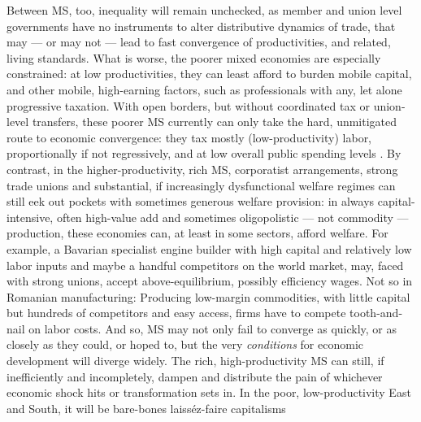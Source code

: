\documentclass[11pt,a4paper,oneside,openright]{article}
\begin{document}
Between \gls{MS}, too, inequality will remain unchecked, as member and union level governments have no instruments to alter distributive dynamics of trade, that may --- or may not --- lead to fast convergence of productivities, and related, living standards. 
What is worse, the poorer mixed economies are especially constrained: 
at low productivities, they can least afford to burden mobile capital, and other mobile, high-earning factors, such as professionals with any, let alone progressive taxation. 
With open borders, but without coordinated tax or union-level transfers, these poorer \gls{MS} currently can only take the hard, unmitigated route to economic convergence: 
they tax mostly (low-productivity) labor, proportionally if not regressively, and at low overall public spending levels \citep[e.g.][267]{DaudUngl2008}. 
By contrast, in the higher-productivity, rich \gls{MS}, corporatist arrangements, strong trade unions and substantial, if increasingly dysfunctional welfare regimes can still eek out pockets with sometimes generous welfare provision: 
in always capital-intensive, often high-value add and sometimes oligopolistic --- not commodity ---production, these economies can, at least in some sectors, afford welfare. 
For example, a Bavarian specialist engine builder with high capital and relatively low labor inputs and maybe a handful competitors on the world market,  may, faced with strong unions, accept above-equilibrium, possibly efficiency wages. 
Not so in Romanian manufacturing: 
Producing low-margin commodities, with little capital but hundreds of competitors and easy access, firms have to compete tooth-and-nail on labor costs. 
And so, \gls{MS} may not only fail to converge as quickly, or as closely as they could, or hoped to, but the very \emph{conditions} for economic development will diverge widely. 
The rich, high-productivity \gls{MS} can still, if inefficiently and incompletely, dampen and distribute the pain of whichever economic shock hits or transformation sets in. 
In the poor, low-productivity East and South, it will be bare-bones laiss\'{e}z-faire capitalisms
\end{document}
